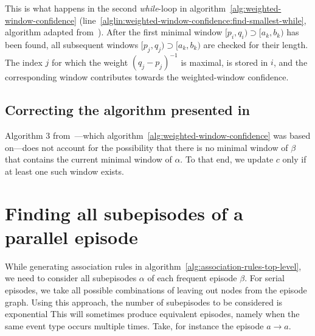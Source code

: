 This is what happens in the second \emph{while}-loop in algorithm~\ref{alg:weighted-window-confidence} (line~\ref{alglin:weighted-window-confidence:find-smallest-while}, algorithm adapted from~\cite{cule2014marbles}). After the first minimal window $ [p_i, q_i) \supset [a_k, b_k) $ has been found, all subsequent windows $ [p_j, q_j) \supset [a_k, b_k) $ are checked for their length. The index $ j $ for which the weight $ (q_j - p_j)^{-1} $ is maximal, is stored in $ i $, and the corresponding window contributes towards the weighted-window confidence.

\subsection{Correcting the algorithm presented in~\citep{cule2014marbles}}

Algorithm 3 from~\citep{cule2014marbles}---which algorithm~\ref{alg:weighted-window-confidence} was based on---does not account for the possibility that there is no minimal window of $ \beta $ that contains the current minimal window of $ \alpha $. To that end, we update $ c $ only if at least one such window exists.

\section{Finding all subepisodes of a parallel episode}

While generating association rules in algorithm~\ref{alg:association-rules-top-level}, we need to consider all subepisodes $ \alpha $ of each frequent episode $ \beta $. For serial episodes, we take all possible combinations of leaving out nodes from the episode graph. Using this approach, the number of subepisodes to be considered is exponential This will sometimes produce equivalent episodes, namely when the same event type occurs multiple times. Take, for instance the episode $ a \to a $.

